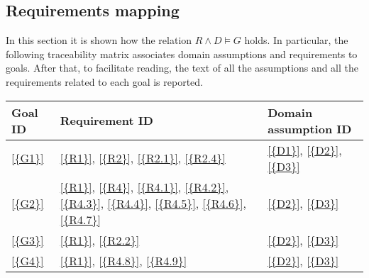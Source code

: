 \subsection{Requirements mapping}
In this section it is shown how the relation $R\land D \models G$ holds.
In particular, the following traceability matrix associates domain assumptions and requirements to goals.
After that, to facilitate reading, the text of all the assumptions and all the requirements related to each goal is reported.

\begin{table}[H]
      \centering
      \begin{tabular}{|l|p{8cm}|p{5cm}|}
            \hline
            \textbf{Goal ID} & \textbf{Requirement ID}                                                                                                                                                                                                      & \textbf{Domain assumption ID}                                                                  \\\hline
            \ref{{G1}}       & \ref{{R1}}, \ref{{R2}}, \ref{{R2.1}}, \ref{{R2.4}}                                                                                                                                                                           & \ref{{D1}}, \ref{{D2}}, \ref{{D3}}                                                             \\\hline
            \ref{{G2}}       & \ref{{R1}}, \ref{{R4}}, \ref{{R4.1}}, \ref{{R4.2}}, \ref{{R4.3}}, \ref{{R4.4}}, \ref{{R4.5}}, \ref{{R4.6}}, \ref{{R4.7}}                                                                                                     & \ref{{D2}}, \ref{{D3}}                                                                         \\\hline
            \ref{{G3}}       & \ref{{R1}}, \ref{{R2.2}}                                                                                                                                                                                                     & \ref{{D2}}, \ref{{D3}}                                                                         \\\hline
            \ref{{G4}}       & \ref{{R1}}, \ref{{R4.8}}, \ref{{R4.9}}                                                                                                                                                                                       & \ref{{D2}}, \ref{{D3}}                                                                         \\\hline

\end{tabular}
\end{table}

